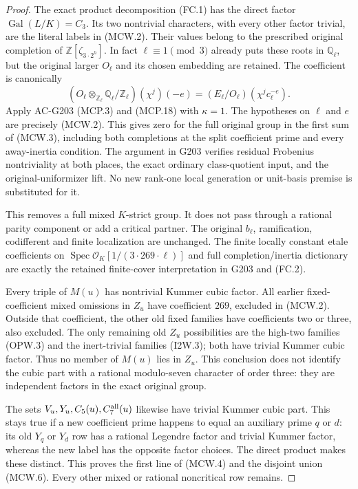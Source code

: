 \begin{proof}
The exact product decomposition (FC.1) has the direct factor
$\operatorname{Gal}(L/K)=C_3$. Its two nontrivial characters,
with every other factor trivial, are the literal labels in (MCW.2).
Their values belong to the prescribed original completion of
$\mathbb Z[\zeta_{3\cdot2^h}]$. In fact $\ell\equiv1\pmod3$
already puts these roots in $\mathbb Q_\ell$, but the original
larger $O_\ell$ and its chosen embedding are retained.
The coefficient is canonically
\[
 (O_\ell\otimes_{\mathbb Z_\ell}\mathbb Q_\ell/\mathbb Z_\ell)
            (\chi^j)(-e)
       =(E_\ell/O_\ell)(\chi^j c_\ell^{-e}).
 \tag{MCW.8}
\]
Apply AC-G203 (MCP.3) and (MCP.18) with $\kappa=1$.
The hypotheses on $\ell$ and $e$ are precisely (MCW.2).
This gives zero for the full original group in the first sum
of (MCW.3), including both completions at the split coefficient
prime and every away-inertia condition.
The argument in G203 verifies residual Frobenius nontriviality
at both places, the exact ordinary class-quotient input, and the
original-uniformizer lift. No new rank-one local generation or
unit-basis premise is substituted for it.

This removes a full mixed $K$-strict group. It does not pass
through a rational parity component or add a critical partner.
The original $b_\ell$, ramification, codifferent and finite
localization are unchanged. The finite locally constant etale
coefficients on $\operatorname{Spec}\mathcal O_K[1/(3\cdot269\cdot\ell)]$
and full completion/inertia dictionary are exactly the retained
finite-cover interpretation in G203 and (FC.2).

Every triple of $M(u)$ has nontrivial Kummer cubic factor.
All earlier fixed-coefficient mixed omissions in $Z_u$ have
coefficient $269$, excluded in (MCW.2).
Outside that coefficient, the other old fixed families have
coefficients two or three, also excluded. The only remaining
old $Z_u$ possibilities are the high-two families (OPW.3) and
the inert-trivial families (I2W.3); both have trivial Kummer
cubic factor. Thus no member of $M(u)$ lies in $Z_u$.
This conclusion does not identify the cubic part with a
rational modulo-seven character of order three: they are
independent factors in the exact original group.

The sets $V_u,Y_u,C_5(u),C_7^{\rm all}(u)$ likewise have trivial
Kummer cubic part. This stays true if a new coefficient prime
happens to equal an auxiliary prime $q$ or $d$: its old $Y_q$
or $Y_d$ row has a rational Legendre factor and trivial Kummer
factor, whereas the new label has the opposite factor choices.
The direct product makes these distinct.
This proves the first line of (MCW.4) and the disjoint union
(MCW.6). Every other mixed or rational noncritical row remains.


\end{proof}
